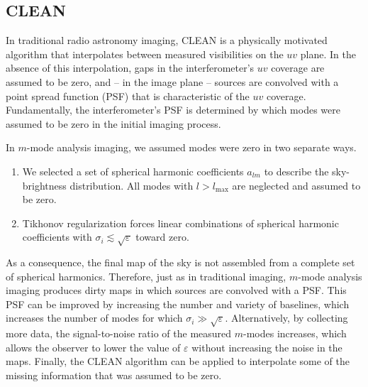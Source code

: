 \begin{bibunit}
\subsection{CLEAN}\label{sec:clean}

In traditional radio astronomy imaging, CLEAN \citep{1974A&AS...15..417H} is a physically motivated
algorithm that interpolates between measured visibilities on the $uv$ plane. In the absence of this
interpolation, gaps in the interferometer's $uv$ coverage are assumed to be zero, and -- in the
image plane -- sources are convolved with a point spread function (PSF) that is characteristic of
the $uv$ coverage.  Fundamentally, the interferometer's PSF is determined by which modes were
assumed to be zero in the initial imaging process.

In $m$-mode analysis imaging, we assumed modes were zero in two separate ways.
\begin{enumerate}
    \item We selected a set of spherical harmonic coefficients $a_{lm}$ to describe the
        sky-brightness distribution. All modes with $l>l_\text{max}$ are neglected and assumed to be
        zero.
    \item Tikhonov regularization forces linear combinations of spherical harmonic coefficients with
        $\sigma_i \lesssim \sqrt{\varepsilon}$ toward zero.
\end{enumerate}
As a consequence, the final map of the sky is not assembled from a complete set of spherical
harmonics. Therefore, just as in traditional imaging, $m$-mode analysis imaging produces dirty maps
in which sources are convolved with a PSF.  This PSF can be improved by increasing the number and
variety of baselines, which increases the number of modes for which $\sigma_i \gg
\sqrt{\varepsilon}$.  Alternatively, by collecting more data, the signal-to-noise ratio of the
measured $m$-modes increases, which allows the observer to lower the value of $\varepsilon$ without
increasing the noise in the maps.  Finally, the CLEAN algorithm can be applied to interpolate some
of the missing information that was assumed to be zero.


\end{bibunit}
